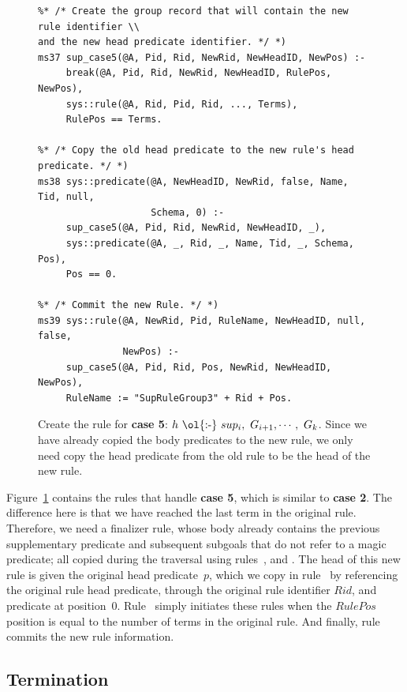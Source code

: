 \begin{figure}[!t]
\ssp
\centering
\begin{lstlisting}
%* /* Create the group record that will contain the new rule identifier \\
and the new head predicate identifier. */ *)
ms37 sup_case5(@A, Pid, Rid, NewRid, NewHeadID, NewPos) :-
     break(@A, Pid, Rid, NewRid, NewHeadID, RulePos, NewPos),
     sys::rule(@A, Rid, Pid, Rid, ..., Terms),
     RulePos == Terms.
	
%* /* Copy the old head predicate to the new rule's head predicate. */ *)
ms38 sys::predicate(@A, NewHeadID, NewRid, false, Name, Tid, null, 
                    Schema, 0) :-
     sup_case5(@A, Pid, Rid, NewRid, NewHeadID, _),
     sys::predicate(@A, _, Rid, _, Name, Tid, _, Schema, Pos),
     Pos == 0.
	
%* /* Commit the new Rule. */ *)
ms39 sys::rule(@A, NewRid, Pid, RuleName, NewHeadID, null, false, 
               NewPos) :-
     sup_case5(@A, Pid, Rid, Pos, NewRid, NewHeadID, NewPos),
     RuleName := "SupRuleGroup3" + Rid + Pos.
\end{lstlisting}
\caption{\label{ch:magic:fig:rewrite9} 
Create the rule for {\bf case 5}: $h\ \text{\ol{:-}}\ sup_i,\ G_{i+1}, \cdots,\ G_k$. 
Since we have already copied the body predicates to the new rule, we only
need copy the head predicate from the old rule to be the head of the new rule.}
\end{figure}

Figure~\ref{ch:magic:fig:rewrite9} contains the rules that handle {\bf case 5},
which is similar to {\bf case 2}.  The difference here is that we have reached
the last term in the original rule.  Therefore, we need a finalizer rule, whose
body already contains the previous supplementary predicate and subsequent
subgoals that do not refer to a magic predicate; all copied during the
 traversal using rules~,  and .  The
head of this new rule is given the original head predicate~$p$, which we copy
in rule~ by referencing the original rule head predicate, through the
original rule identifier $Rid$, and predicate at position~$0$.  Rule~
simply initiates these rules when the $RulePos$ position is equal to the number
of terms in the original rule.  And finally, rule~ commits the new
rule information.

\subsection{Termination}

